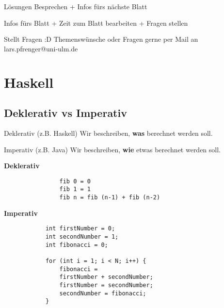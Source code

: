 \documentclass[
	aspectratio=169, 
	10pt 
]{beamer}
\begin{document}
\begin{frame}{\insertsubsection}
	\begin{description}[Woche A:]
		\item[\textbf{Woche A}:] Lösungen Besprechen + Infos fürs nächste Blatt
		\item[\textbf{Woche B}:] Infos fürs Blatt + Zeit zum Blatt bearbeiten + Fragen stellen
	\end{description}
\end{frame}

\begin{frame}{\insertsubsection}
	\center Stellt Fragen :D
	\center Themenswünsche oder Fragen gerne per Mail an lars.pfrenger@uni-ulm.de
\end{frame}

\section{Haskell}
\subsection{Deklerativ vs Imperativ}
\begin{frame}{\insertsubsection}
	\begin{fancycolumns}
		\begin{info}{Deklerativ (z.B. Haskell)}
			Wir beschreiben, \textbf{was} berechnet werden soll.
		\end{info}
		\nextcolumn
		\begin{info}{Imperativ (z.B. Java)}
			Wir beschreiben, \textbf{wie} etwas berechnet werden soll.
		\end{info}
	\end{fancycolumns}
\end{frame}

\begin{frame}[fragile]{\insertsubsection}
	\begin{fancycolumns}[T,widths={50,50}]
		\textbf{Deklerativ}\break\mbox{}\newline
		\begin{minipage}{0.5\textwidth}
			\begin{verbatim}
				fib 0 = 0
				fib 1 = 1
				fib n = fib (n-1) + fib (n-2)
			\end{verbatim}
		\end{minipage}
		\nextcolumn	
		\textbf{Imperativ}\break\mbox{}\newline
	\begin{minipage}{0.5\textwidth}
		\begin{verbatim}
			int firstNumber = 0;
			int secondNumber = 1;
			int fibonacci = 0;

			for (int i = 1; i < N; i++) {
				fibonacci = 
				firstNumber + secondNumber;
				firstNumber = secondNumber;
				secondNumber = fibonacci;
			}
		\end{verbatim}
	\end{minipage}
	\end{fancycolumns}
\end{frame}
\end{document}
